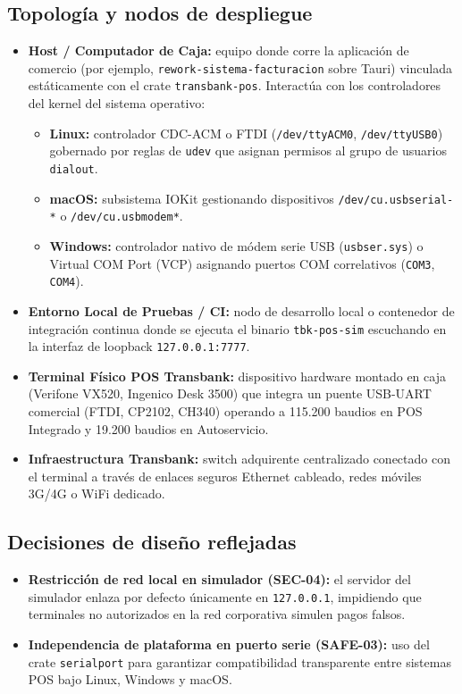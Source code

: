 \documentclass{../../plantilla/raysac-informe}
\begin{document}
\subsection{Topología y nodos de despliegue}
\begin{itemize}
  \item \textbf{Host / Computador de Caja:} equipo donde corre la aplicación de comercio (por ejemplo,
    \texttt{rework-sistema-facturacion} sobre Tauri) vinculada estáticamente con el crate \texttt{transbank-pos}.
    Interactúa con los controladores del kernel del sistema operativo:
    \begin{itemize}
      \item \textbf{Linux:} controlador CDC-ACM o FTDI (\texttt{/dev/ttyACM0}, \texttt{/dev/ttyUSB0})
        gobernado por reglas de \texttt{udev} que asignan permisos al grupo de usuarios \texttt{dialout}.
      \item \textbf{macOS:} subsistema IOKit gestionando dispositivos \texttt{/dev/cu.usbserial-*} o
        \texttt{/dev/cu.usbmodem*}.
      \item \textbf{Windows:} controlador nativo de módem serie USB (\texttt{usbser.sys}) o Virtual COM Port (VCP)
        asignando puertos COM correlativos (\texttt{COM3}, \texttt{COM4}).
    \end{itemize}
  \item \textbf{Entorno Local de Pruebas / CI:} nodo de desarrollo local o contenedor de integración continua
    donde se ejecuta el binario \texttt{tbk-pos-sim} escuchando en la interfaz de loopback \texttt{127.0.0.1:7777}.
  \item \textbf{Terminal Físico POS Transbank:} dispositivo hardware montado en caja (Verifone VX520,
    Ingenico Desk 3500) que integra un puente USB-UART comercial (FTDI, CP2102, CH340) operando a 115.200 baudios
    en POS Integrado y 19.200 baudios en Autoservicio.
  \item \textbf{Infraestructura Transbank:} switch adquirente centralizado conectado con el terminal a través
    de enlaces seguros Ethernet cableado, redes móviles 3G/4G o WiFi dedicado.
\end{itemize}

\subsection{Decisiones de diseño reflejadas}
\begin{itemize}
  \item \textbf{Restricción de red local en simulador (SEC-04):} el servidor del simulador enlaza por defecto
    únicamente en \texttt{127.0.0.1}, impidiendo que terminales no autorizados en la red corporativa simulen pagos falsos.
  \item \textbf{Independencia de plataforma en puerto serie (SAFE-03):} uso del crate \texttt{serialport}
    para garantizar compatibilidad transparente entre sistemas POS bajo Linux, Windows y macOS.
\end{itemize}
\end{document}
